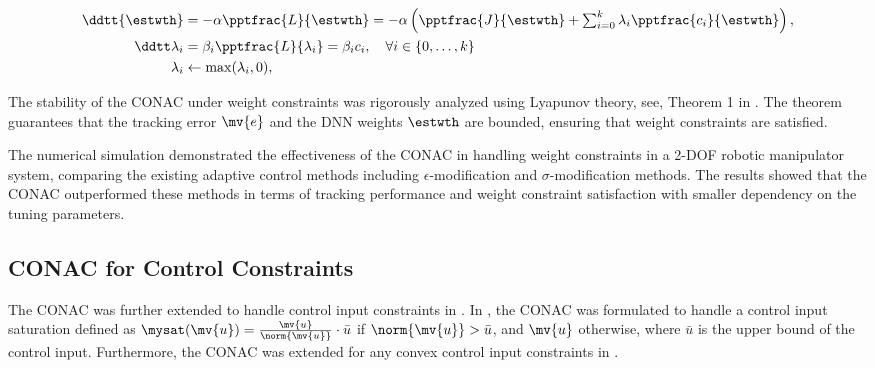 \documentclass[letterpaper, 10 pt, conference]{ieeeconf}  %
\begin{document}
\begin{subequations}
    \begin{align}
            \ddtt{\estwth}
            &
            =
            -\alpha \pptfrac{L}{\estwth}
            =
            -\alpha 
            \left(
                \pptfrac{J}{\estwth}
                +
                \textstyle\sum_{i=0}^k
                \lambda_i
                \pptfrac{c_i}{\estwth}
            \right),
        \label{eq:adap:th}
            \\
            \ddtt\lambda_i
            & 
            = 
            \beta_i\pptfrac{L}{\lambda_i} 
            = 
            \beta_i c_i ,
            \quad \forall i\in\{0,\ldots,k\}
        \label{eq:adap:lbd}
            \\
            \lambda_i & \leftarrow \max(\lambda_i,0) ,
        \label{eq:adap:lbd:max}
    \end{align}
    \label{eq:adaptation law}%
\end{subequations}

The stability of the CONAC under weight constraints was rigorously analyzed using Lyapunov theory, \ie see, Theorem 1 in \cite{Ryu:2024aa}.
The theorem guarantees that the tracking error $\mv{e}$ and the DNN weights $\estwth$ are bounded, ensuring that weight constraints are satisfied.

The numerical simulation demonstrated the effectiveness of the CONAC in handling weight constraints in a 2-DOF robotic manipulator system, comparing the existing adaptive control methods including $\epsilon$-modification and $\sigma$-modification methods.
The results showed that the CONAC outperformed these methods in terms of tracking performance and weight constraint satisfaction with smaller dependency on the tuning parameters.

\subsection{CONAC for Control Constraints}

The CONAC was further extended to handle control input constraints in \cite{Ryu:2024ab,Ryu:2025aa}.
In \cite{Ryu:2024ab}, the CONAC was formulated to handle a control input saturation defined as $\mysat(\mv{u})=\tfrac{\mv{u}}{\norm{\mv{u}}}\cdot\bar{u}$ if $\norm{\mv{u}}>\bar{u}$, and $\mv{u}$ otherwise, where $\bar{u}$ is the upper bound of the control input.
Furthermore, the CONAC was extended for any convex control input constraints in \cite{Ryu:2025aa}.
\end{document}
